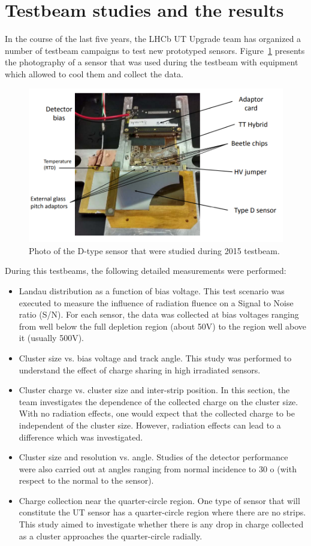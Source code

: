 \section{Testbeam studies and the results}
In the course of the last five years, the LHCb UT Upgrade team has organized a number of testbeam campaigns to test new prototyped sensors. Figure~\ref{fig:DUT} presents the photography of a sensor that was used during the testbeam with equipment which allowed to cool
them and collect the data. 

\begin{figure}
\centering
\includegraphics{figures/Sensor_photo.PNG}
\caption{Photo of the D-type sensor that were studied during 2015 testbeam.}
\label{fig:DUT}
\end{figure}

During this testbeams, the following detailed measurements were performed: 

\begin{itemize}
\item Landau distribution as a function of bias voltage. This test scenario was executed to measure the influence of radiation fluence on a Signal to Noise ratio (S/N).  For each sensor, the data was collected at bias voltages ranging from well below the full depletion region (about 50V) to the region well above it (usually 500V).
\item  Cluster size vs. bias voltage and track angle. This study was performed to understand the effect of charge sharing in high irradiated sensors. 
\item Cluster charge vs. cluster size and inter-strip position. In this section, the team investigates the dependence of the collected charge on the cluster size. With no radiation effects, one would expect that the collected charge to be independent of the cluster size. However, radiation effects can lead to a difference which was investigated. 
\item Cluster size and resolution vs. angle.  Studies of the detector performance were also carried out at angles ranging from normal incidence to 30 o (with respect to the normal to the sensor). 
\item Charge collection near the quarter-circle region. One type of sensor that will constitute the UT sensor has a quarter-circle region where there are no strips. This study aimed to investigate whether there is any drop in charge collected as a cluster approaches the quarter-circle radially. 
\end{itemize}

